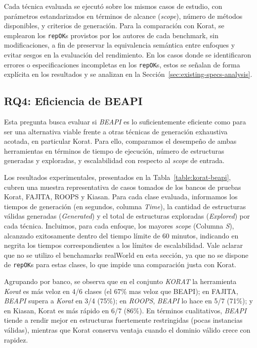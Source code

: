 Cada técnica evaluada se ejecutó sobre los mismos casos de estudio, con parámetros estandarizados 
en términos de alcance (\textit{scope}), número de métodos disponibles, y criterios de generación. 
Para la comparación con \textsf{Korat}, se emplearon los \texttt{repOK}s provistos por los autores 
de cada benchmark, sin modificaciones, a fin de preservar la equivalencia semántica entre enfoques 
y evitar sesgos en la evaluación del rendimiento. En los casos donde se identificaron errores o 
especificaciones incompletas en los \texttt{repOK}s, estos se señalan de forma explícita en los 
resultados y se analizan en la Sección~\ref{sec:existing-specs-analysis}.



\subsection{RQ4: Eficiencia de BEAPI}

Esta pregunta busca evaluar si \emph{BEAPI} es lo suficientemente eficiente como para ser una 
alternativa viable frente a otras técnicas de generación exhaustiva acotada, en particular 
\textsf{Korat}. Para ello, comparamos el desempeño de ambas herramientas en términos de tiempo 
de ejecución, número de estructuras generadas y exploradas, y escalabilidad con respecto al 
\emph{scope} de entrada.

Los resultados experimentales, presentados en la Tabla~\ref{table:korat-beapi}, cubren una muestra 
representativa de casos tomados de los bancos de pruebas \textsf{Korat}, \textsf{FAJITA}, 
\textsf{ROOPS} y \textsf{Kiasan}. Para cada clase evaluada, informamos los tiempos de generación 
(en segundos, columna \emph{Time}), la cantidad de estructuras válidas generadas (\emph{Generated}) y el total de estructuras exploradas 
(\emph{Explored}) por cada técnica. Incluimos, para cada enfoque, los mayores \emph{scope} (Columna \emph{S}), alcanzado exitosamente dentro 
del tiempo límite de 60 minutos, indicando en negrita los tiempos correspondientes a los límites 
de escalabilidad. Vale aclarar que no se utilizo el benchamarks \textsf{realWorld} en esta sección, ya que
no se dispone de \texttt{repOK}s para estas clases, lo que impide una comparación justa con \textsf{Korat}.

Agrupando por banco, se observa que en el conjunto \emph{KORAT} la herramienta \emph{Korat} es más veloz en 4/6 clases (el 67\% mas veloz que \textsf{BEAPI}); 
en \textsf{FAJITA}, \emph{BEAPI} supera a \emph{Korat} en 3/4 (75\%); en \emph{ROOPS}, \emph{BEAPI} lo hace en 5/7 (71\%); 
y en \textsf{Kiasan}, \textsf{Korat} es más rápido en 6/7 (86\%). 
En términos cualitativos, \emph{BEAPI} tiende a rendir mejor en estructuras fuertemente restringidas (pocas instancias válidas), 
mientras que \textsf{Korat} conserva ventaja cuando el dominio válido crece con rapidez.

